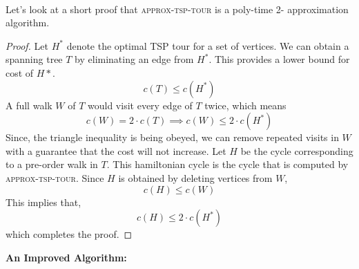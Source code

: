 \documentclass[11pt]{article}
\begin{document}
  \paragraph{} Let's look at a short proof that \textsc{approx-tsp-tour} is a poly-time 2- approximation algorithm. 
  \begin{proof}
    Let $H^*$ denote the optimal TSP tour for a set of vertices. We can obtain a spanning tree $T$ by eliminating an edge from 
    $H^*$. This provides a lower bound for cost of $H*$. 
    \[c(T) \leq c(H^*)\] A full walk $W$ of $T$ would visit every edge of $T$ twice, which means   
    \[c(W) = 2\cdot c(T) \implies c(W) \leq 2\cdot c(H^*)\]
  Since, the triangle inequality is being obeyed, we can remove repeated visits in $W$ with a guarantee that 
  the cost will not increase.
  Let $H$ be the cycle corresponding to a pre-order walk in $T$. This hamiltonian cycle is the cycle that is computed by 
  \textsc{approx-tsp-tour}. Since $H$ is obtained by deleting vertices from $W$,
  \[c(H) \leq c(W)\]
  This implies that, \[c(H) \leq 2\cdot c(H^*)\] which completes the proof. 
  \end{proof}

  {\large{\textbf{An Improved Algorithm:}}}  \paragraph{}
  
\end{document}
